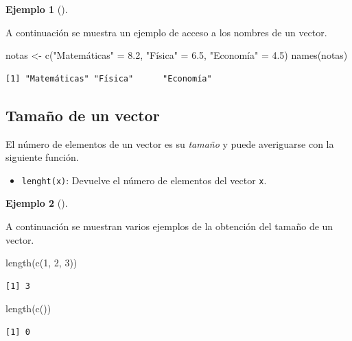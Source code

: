 \documentclass[
  a4paper,
]{scrreport}
\newenvironment{Shaded}{\begin{snugshade}}{\end{snugshade}}
\newcommand{\DecValTok}[1]{\textcolor[rgb]{0.68,0.00,0.00}{#1}}
\newcommand{\FloatTok}[1]{\textcolor[rgb]{0.68,0.00,0.00}{#1}}
\newcommand{\FunctionTok}[1]{\textcolor[rgb]{0.28,0.35,0.67}{#1}}
\newcommand{\NormalTok}[1]{\textcolor[rgb]{0.00,0.23,0.31}{#1}}
\newcommand{\OtherTok}[1]{\textcolor[rgb]{0.00,0.23,0.31}{#1}}
\newcommand{\StringTok}[1]{\textcolor[rgb]{0.13,0.47,0.30}{#1}}
\providecommand{\tightlist}{%
  \setlength{\itemsep}{0pt}\setlength{\parskip}{0pt}}\usepackage{longtable,booktabs,array}
\theoremstyle{definition}
\newtheorem{example}{Ejemplo}[chapter]
\theoremstyle{definition}
\theoremstyle{remark}
\begin{document}
\leavevmode{}%
\begin{example}[]\label{exm-acceso-nombres-vector}

A continuación se muestra un ejemplo de acceso a los nombres de un
vector.

\begin{Shaded}
\begin{Highlighting}[]
\NormalTok{notas }\OtherTok{\textless{}{-}} \FunctionTok{c}\NormalTok{(}\StringTok{"Matemáticas"} \OtherTok{=} \FloatTok{8.2}\NormalTok{, }\StringTok{"Física"} \OtherTok{=} \FloatTok{6.5}\NormalTok{, }\StringTok{"Economía"} \OtherTok{=} \FloatTok{4.5}\NormalTok{)}
\FunctionTok{names}\NormalTok{(notas)}
\end{Highlighting}
\end{Shaded}

\begin{verbatim}
[1] "Matemáticas" "Física"      "Economía"   
\end{verbatim}

\end{example}

\hypertarget{tamauxf1o-de-un-vector}{%
\subsection{Tamaño de un vector}\label{tamauxf1o-de-un-vector}}

El número de elementos de un vector es su \emph{tamaño} y puede
averiguarse con la siguiente función.

\begin{itemize}
\tightlist
\item
  \texttt{lenght(x)}: Devuelve el número de elementos del vector
  \texttt{x}.
\end{itemize}

\leavevmode{}%
\begin{example}[]\label{exm-tamaño-vector}

A continuación se muestran varios ejemplos de la obtención del tamaño de
un vector.

\begin{Shaded}
\begin{Highlighting}[]
\FunctionTok{length}\NormalTok{(}\FunctionTok{c}\NormalTok{(}\DecValTok{1}\NormalTok{, }\DecValTok{2}\NormalTok{, }\DecValTok{3}\NormalTok{))}
\end{Highlighting}
\end{Shaded}

\begin{verbatim}
[1] 3
\end{verbatim}

\begin{Shaded}
\begin{Highlighting}[]
\FunctionTok{length}\NormalTok{(}\FunctionTok{c}\NormalTok{())}
\end{Highlighting}
\end{Shaded}

\begin{verbatim}
[1] 0
\end{verbatim}

\end{example}
\end{document}
